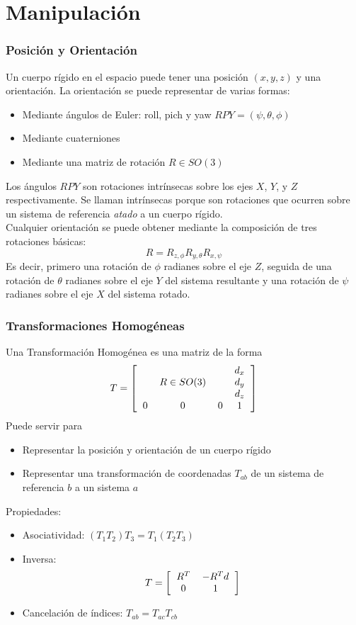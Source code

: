 \section{Manipulación}

\begin{frame}\frametitle{Posición y Orientación}
  Un cuerpo rígido en el espacio puede tener una posición $(x,y,z)$ y una orientación. La orientación se puede representar de varias formas:
  \begin{itemize}
  \item Mediante ángulos de Euler: roll, pich y yaw $RPY = (\psi, \theta, \phi)$
  \item Mediante cuaterniones
  \item Mediante una matriz de rotación $R \in SO(3)$
  \end{itemize}
  Los ángulos $RPY$ son rotaciones intrínsecas sobre los ejes $X$, $Y$, y $Z$ respectivamente. Se llaman intrínsecas porque son rotaciones que ocurren sobre un sistema de referencia \textit{atado} a un cuerpo rígido.\\
  Cualquier orientación se puede obtener mediante la composición de tres rotaciones básicas:
  \[R = R_{z,\phi}R_{y,\theta}R_{x,\psi}\]
  Es decir, primero una rotación de $\phi$ radianes sobre el eje $Z$, seguida de una rotación de $\theta$ radianes sobre el eje $Y$ del sistema resultante y una rotación de $\psi$ radianes sobre el eje $X$ del sistema rotado. 
\end{frame}

\begin{frame}\frametitle{Transformaciones Homogéneas}
  Una Transformación Homogénea es una matriz de la forma
  \[T = \left[\begin{tabular}{cccc}
      & & & $d_x$\\
      & $R\in SO(3)$ & & $d_y$\\
      & & & $d_z$\\
      0 & 0& 0 & 1
    \end{tabular}\right]\]
  Puede servir para
  \begin{itemize}
  \item Representar la posición y orientación de un cuerpo rígido
  \item Representar una transformación de coordenadas $T_{ab}$ de un sistema de referencia $b$ a un sistema $a$
  \end{itemize}
  Propiedades:
  \begin{itemize}
  \item Asociatividad: $(T_1 T_2) T_3 = T_1 (T_2 T_3)$
  \item Inversa:
    \[T = \left[\begin{tabular}{cc}
       $R^T$ & $-R^T d$\\
       0 & 1
      \end{tabular}\right]\]
  \item Cancelación de índices: $T_{ab} = T_{ac}T_{cb}$
  \end{itemize}
\end{frame}

